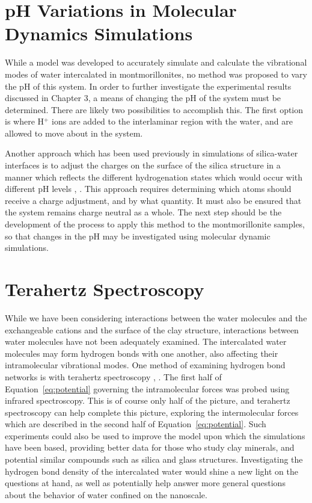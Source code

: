 \section{pH Variations in Molecular Dynamics Simulations}
While a model was developed to accurately simulate and calculate the vibrational modes of water intercalated in montmorillonites, no method was proposed to vary the pH of this system. In order to further investigate the experimental results discussed in Chapter 3, a means of changing the pH of the system must be determined. There are likely two possibilities to accomplish this. The first option is where H$^+$ ions are added to the interlaminar region with the water, and are allowed to move about in the system.

Another approach which has been used previously in simulations of silica-water interfaces is to adjust the charges on the surface of the silica structure in a manner which reflects the different hydrogenation states which would occur with different pH levels \cite{emami2014force}, \cite{emami2014prediction}. This approach requires determining which atoms should receive a charge adjustment, and by what quantity. It must also be ensured that the system remains charge neutral as a whole. The next step should be the development of the process to apply this method to the montmorillonite samples, so that changes in the pH may be investigated using molecular dynamic simulations.

\section{Terahertz Spectroscopy}
While we have been considering interactions between the water molecules and the exchangeable cations and the surface of the clay structure, interactions between water molecules have not been adequately examined. The intercalated water molecules may form hydrogen bonds with one another, also affecting their intramolecular vibrational modes. One method of examining hydrogen bond networks is with terahertz spectroscopy \cite{liu1997terahertz}, \cite{shiraga2014hydration}. The first half of Equation~\ref{eq:potential} governing the intramolecular forces was probed using infrared spectroscopy. This is of course only half of the picture, and terahertz spectroscopy can help complete this picture, exploring the intermolecular forces which are described in the second half of Equation~\ref{eq:potential}. Such experiments could also be used to improve the model upon which the simulations have been based, providing better data for those who study clay minerals, and potential similar compounds such as silica and glass structures. Investigating the hydrogen bond density of the intercalated water would shine a new light on the questions at hand, as well as potentially help answer more general questions about the behavior of water confined on the nanoscale.

